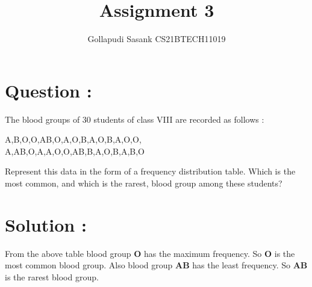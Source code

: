 \documentclass[twocolumn,12pt]{article}
\title{Assignment 3}
\author{Gollapudi Sasank CS21BTECH11019}
\begin{document}
\maketitle
\section*{Question : }
The blood groups of 30 students of class VIII are recorded as follows :

\begin{center}
A,B,O,O,AB,O,A,O,B,A,O,B,A,O,O,\\
A,AB,O,A,A,O,O,AB,B,A,O,B,A,B,O
\end{center}

\noindent Represent this data in the form of a frequency distribution table. Which is the most common, and which is the rarest, blood group among these students? 
\section*{Solution : }
\begin{table}[ht!]

\centering
\caption{}
\label{table:table 1}
\end{table}
\noindent From the above table blood group \textbf{O} has the maximum frequency. So \textbf{O} is the most common blood group. Also blood group \textbf{AB} has the least frequency. So \textbf{AB} is the rarest blood group.\\ 
\end{document}
